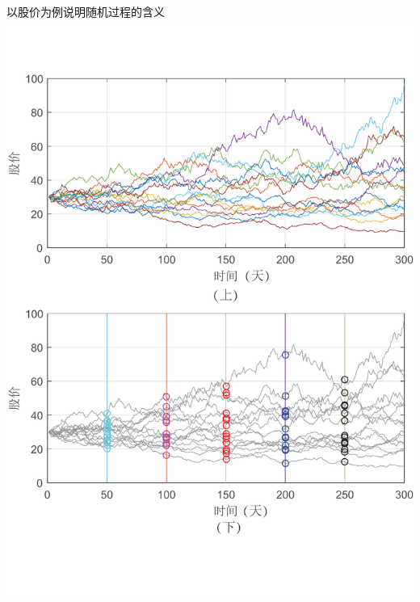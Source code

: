 \documentclass[t]{beamer}
\begin{document}
  \begin{frame}{以股价为例说明随机过程的含义}
  \centering  \includegraphics[scale=.3]{fig/stk.pdf}
  
  \end{frame}
  
\end{document}
